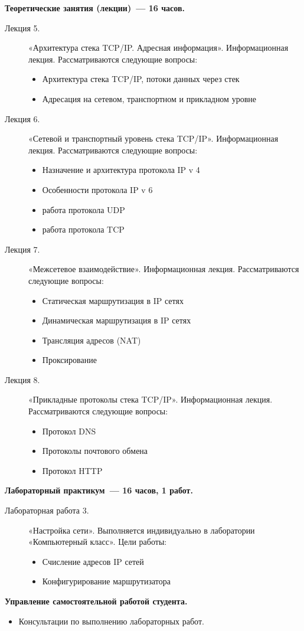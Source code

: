 {\parindent0pt

\textbf{Теоретические занятия (лекции)~— 16 часов.}
\begin{description}
\item[Лекция 5.] «Архитектура стека TCP/IP. Адресная информация». Информационная лекция. Рассматриваются следующие вопросы: \begin{itemize}
\item Архитектура стека TCP/IP, потоки данных через стек\item Адресация на сетевом, транспортном и прикладном уровне
\end{itemize}\item[Лекция 6.] «Сетевой и транспортный уровень стека TCP/IP». Информационная лекция. Рассматриваются следующие вопросы: \begin{itemize}
\item Назначение и архитектура протокола IP v 4\item Особенности протокола IP v 6\item работа протокола UDP\item работа протокола TCP
\end{itemize}\item[Лекция 7.] «Межсетевое взаимодействие». Информационная лекция. Рассматриваются следующие вопросы: \begin{itemize}
\item Статическая маршрутизация в IP сетях\item Динамическая маршрутизация в IP сетях\item Трансляция адресов (NAT)\item Проксирование
\end{itemize}\item[Лекция 8.] «Прикладные протоколы стека TCP/IP». Информационная лекция. Рассматриваются следующие вопросы: \begin{itemize}
\item Протокол DNS\item Протоколы почтового обмена\item Протокол HTTP
\end{itemize}
\end{description}




\textbf{Лабораторный практикум~— 16 часов, 1 работ.}
\begin{description}
\item[Лабораторная работа 3.] «Настройка сети». Выполняется индивидуально в лаборатории «Компьютерный класс». Цели работы: \begin{itemize}
\item Счисление адресов IP сетей\item Конфигурирование маршрутизатора
\end{itemize}
\end{description}

\textbf{Управление самостоятельной работой студента.}
\begin{itemize}
\item Консультации по выполнению лабораторных работ.
\end{itemize}
}



